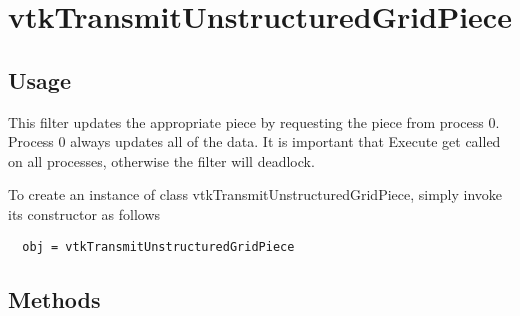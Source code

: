\section{vtkTransmitUnstructuredGridPiece}

\subsection{Usage}

 This filter updates the appropriate piece by requesting the piece from 
 process 0.  Process 0 always updates all of the data.  It is important that 
 Execute get called on all processes, otherwise the filter will deadlock.

To create an instance of class vtkTransmitUnstructuredGridPiece, simply
invoke its constructor as follows
\begin{verbatim}
  obj = vtkTransmitUnstructuredGridPiece
\end{verbatim}
\subsection{Methods}

